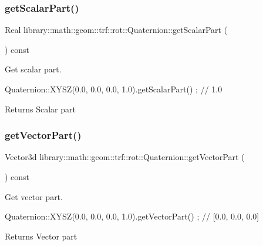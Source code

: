 \subsubsection{\texorpdfstring{get\+Scalar\+Part()}{getScalarPart()}}
{\footnotesize\ttfamily Real library\+::math\+::geom\+::trf\+::rot\+::\+Quaternion\+::get\+Scalar\+Part (\begin{DoxyParamCaption}{ }\end{DoxyParamCaption}) const}



Get scalar part. 


\begin{DoxyCode}
Quaternion::XYSZ(0.0, 0.0, 0.0, 1.0).getScalarPart() ; \textcolor{comment}{// 1.0}
\end{DoxyCode}


\begin{DoxyReturn}{Returns}
Scalar part 
\end{DoxyReturn}
\mbox{\label{classlibrary_1_1math_1_1geom_1_1trf_1_1rot_1_1_quaternion_a3f51bfc8976d79f8d4efb7d32d5a422b}} 
\subsubsection{\texorpdfstring{get\+Vector\+Part()}{getVectorPart()}}
{\footnotesize\ttfamily Vector3d library\+::math\+::geom\+::trf\+::rot\+::\+Quaternion\+::get\+Vector\+Part (\begin{DoxyParamCaption}{ }\end{DoxyParamCaption}) const}



Get vector part. 


\begin{DoxyCode}
Quaternion::XYSZ(0.0, 0.0, 0.0, 1.0).getVectorPart() ; \textcolor{comment}{// [0.0, 0.0, 0.0]}
\end{DoxyCode}


\begin{DoxyReturn}{Returns}
Vector part 
\end{DoxyReturn}
\mbox{\label{classlibrary_1_1math_1_1geom_1_1trf_1_1rot_1_1_quaternion_a596228c41391cbba85ca425d9c7c3dbd}} 
